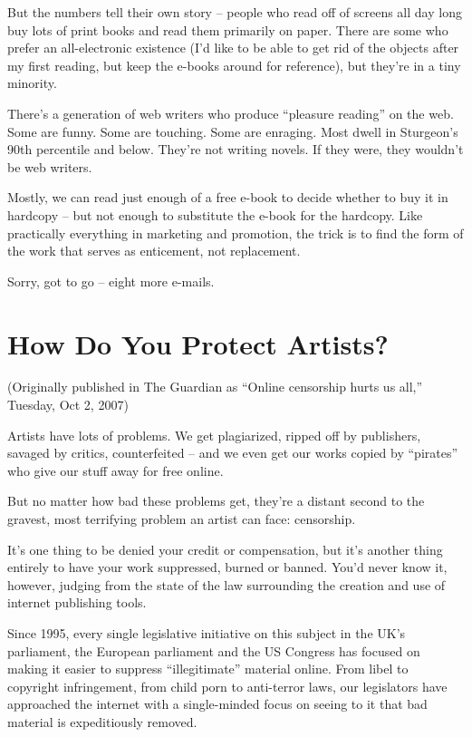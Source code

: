 But the numbers tell their own story -- people who read off of
screens all day long buy lots of print books and read them
primarily on paper. There are some who prefer an all-electronic
existence (I'd like to be able to get rid of the objects after my
first reading, but keep the e-books around for reference), but
they're in a tiny minority.

There's a generation of web writers who produce ``pleasure reading''
on the web. Some are funny. Some are touching. Some are enraging.
Most dwell in Sturgeon's 90th percentile and below. They're not
writing novels. If they were, they wouldn't be web writers.

Mostly, we can read just enough of a free e-book to decide whether
to buy it in hardcopy -- but not enough to substitute the e-book
for the hardcopy. Like practically everything in marketing and
promotion, the trick is to find the form of the work that serves as
enticement, not replacement.

Sorry, got to go -- eight more e-mails.

\section{How Do You Protect Artists?}

(Originally published in The Guardian as ``Online censorship hurts
us all,'' Tuesday, Oct 2, 2007)

Artists have lots of problems. We get plagiarized, ripped off by
publishers, savaged by critics, counterfeited -- and we even get
our works copied by ``pirates'' who give our stuff away for free
online.

But no matter how bad these problems get, they're a distant second
to the gravest, most terrifying problem an artist can face:
censorship.

It's one thing to be denied your credit or compensation, but it's
another thing entirely to have your work suppressed, burned or
banned. You'd never know it, however, judging from the state of the
law surrounding the creation and use of internet publishing tools.

Since 1995, every single legislative initiative on this subject in
the UK's parliament, the European parliament and the US Congress
has focused on making it easier to suppress ``illegitimate'' material
online. From libel to copyright infringement, from child porn to
anti-terror laws, our legislators have approached the internet with
a single-minded focus on seeing to it that bad material is
expeditiously removed.

